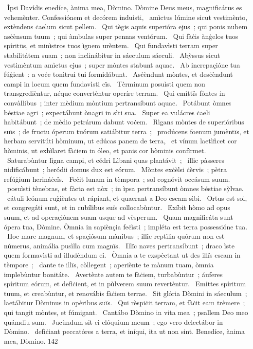{~Ìpsi Davídis}
{%
enedíce, ànima mea, Dòmino. Dòmine Deus meus, magnificátus es vehemènter. Confessiónem et decórem induìsti,
~amìctus lúmine sicut vestimènto, extèndens ċaelum sicut pellem.
~Qui tègis aquïs superióra ejus~; qui ponis nubem asċènsum tuum~; qui àmbulas super pennas ventórum.
~Qui fàċis ànġelos tuos spíritüs, et minìstros tuos ìgnem urèntem.
~Qui fundavìsti terram super stabilitátem suam~; non inclinábitur in sáeculum sáeculi.
~Abỳssus sicut vestimèntum amìctus ejus~; super mòntes stabunt aquae.
~Ab increpaçióne tua fúġient~; a voċe tonìtrui tui formidábunt.
~Asċèndunt mòntes, et desċèndunt campi in locum quem fundavìsti eïs.
~Tèrminum posuìsti quem non transgredièntur, néque convertèntur operíre terram.
~Qui emìttïs fòntes in convàllibus~; inter mèdium mòntium pertransíbunt aquae.
~Potábunt òmnes béstiae agri~; expectábunt ònagri in sìti sua.
~Super ea vulácres ċaeli habitábunt~; de mèdio petrárum dabunt voċem.
~Rìgans mòntes de superióribus suïs~; de fructu óperum tuórum satiábitur terra~;
~prodúcens foenum jumèntïs, et herbam servitúti hòminum, ut edúcas panem de terra,
~et vínum laetìficet cor hòminis, ut exhìlaret fàċiem in óleo, et panis cor hòminis confìrmet.
~Saturabùntur lìgna campi, et cédri Lìbani quas plantávit~;
~illic pàsseres nidificábunt~; heródii domus dux est eórum.
~Mòntes exċèlsi ċèrvïs~; pètra refúġium herináċeïs.
~Feċit lunam in tèmpora~; sol cognóvit occásum suum.
~posuìsti tènebras, et fàcta est nòx~; in ìpsa pertransíbunt òmnes béstiae sỳlvae.
~cátuli leónum ruġièntes ut rápiant, et quaerant a Deo escam sìbi.
~Ortus est sol, et congregáti sunt, et in cubílibus suïs collocabùntur.
~Exíbit hòmo ad opus suum, et ad operaçiónem suam usque ad vèsperum.
~Quam magnificáta sunt ópera tua, Dòmine. Òmnia in sapiènçia feċìsti~; impléta est terra possessióne tua.
~Hoc mare magnum, et spaçiósum mànibus~; illic reptìlia quórum non est númerus, animália pusìlla cum magnïs.
~Illïc naves pertransíbunt~; draco ìste quem formavìsti ad illudèndum ei.
~Òmnia a te exspèctant ut des illïs escam in tèmpore~;
~dante te illïs, còllegent~; aperiènte te mànum tuam, òmnia implebùntur bonitáte.
~Avertènte autem te fàċiem, turbabùntur~; áuferes spíritum eórum, et defìċient, et in pùlverem suum revertèntur.
~Emìttes spíritum tuum, et creabùntur, et renovábis fàċiem terrae.
~Sit glória Dòmini in sáeculum~; laetábitur Dòminus in opèribus suïs.
~Qui rèspiċit terram, et fàċit eam trèmere~; qui tangit mòntes, et fúmigant.
~Cantábo Dòmino in vita mea~; psallem Deo meo quámdiu sum.
~Jucùndum sit ei elóquium meum~; ego vero delectábor in Dòmino.
~defìċiant peccatóres a terra, et iníqui, ita ut non sint. Benedíce, ànima mea, Dòmino.}
{14}{2}
